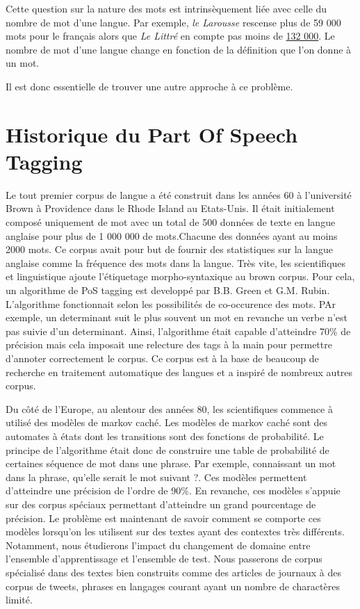 \documentclass[french, 14pt]{memoir}
\begin{document}
Cette question sur la nature des mots est intrinsèquement liée avec celle du nombre de mot d'une langue. Par exemple, \textit{le Larousse} rescense plus de 59 000 mots pour le français alors que \textit{Le Littré} en compte pas moins de \href{https://fr.babbel.com/fr/magazine/quelle-langue-contient-le-plus-de-mots}{132 000}. Le nombre de mot d'une langue change en fonction de la définition que l'on donne à un mot.

Il est donc essentielle de trouver une autre approche à ce problème.

\section{Historique du Part Of Speech Tagging}

Le tout premier corpus de langue a été construit dans les années 60 à l'université Brown à Providence dans le Rhode Island au Etats-Unis. Il était initialement composé uniquement de mot avec un total de 500 données de texte en langue anglaise pour plus de 1 000 000 de mots.Chacune des données ayant au moins 2000 mots. Ce corpus avait pour but de fournir des statistiques sur la langue anglaise comme la fréquence des mots dans la langue. 
Très vite, les scientifiques et linguistique ajoute l'étiquetage morpho-syntaxique au brown corpus. Pour cela, un algorithme de PoS tagging est developpé par B.B. Green et G.M. Rubin. L'algorithme fonctionnait selon les possibilités de co-occurence des mots. PAr exemple, un determinant suit le plus souvent un mot en revanche un verbe n'est pas suivie d'un determinant. Ainsi, l'algorithme était capable d'atteindre 70\% 
de précision mais cela imposait une relecture des tags à la main pour permettre d'annoter correctement le corpus. Ce corpus est à la base de beaucoup de recherche en traitement automatique des langues et a inspiré de nombreux autres corpus. 

Du côté de l'Europe, au alentour des années 80, les scientifiques commence à utilisé des modèles de markov caché. Les modèles de markov caché sont des automates à états dont les transitions sont des fonctions de probabilité. Le principe de l'algorithme était donc de construire une table de probabilité de certaines séquence de mot dans une phrase. Par exemple, connaissant un mot dans la phrase, qu'elle serait le mot suivant ?. Ces modèles permettent d'atteindre une précision de l'ordre de 90\%. En revanche, ces modèles s'appuie sur des corpus spéciaux permettant d'atteindre un grand pourcentage de précision. Le problème est maintenant de savoir comment se comporte ces modèles lorsqu'on les utilisent sur des textes ayant des contextes très différents.
Notamment, nous étudierons l'impact du changement de domaine entre l'ensemble d'apprentissage et l'ensemble de test. Nous passerons de corpus spécialisé dans des textes bien construits comme des articles de journaux à des corpus de tweets, phrases en langages courant ayant un nombre de charactères limité. 
\end{document}
